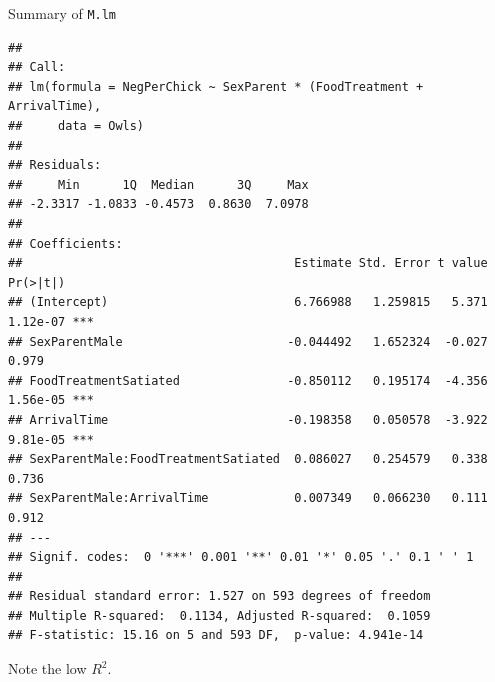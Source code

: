 \documentclass[
  ignorenonframetext,
]{beamer}
\begin{document}
\begin{frame}[fragile]{Summary of \texttt{M.lm}}
\protect\hypertarget{summary-of-m.lm}{}
\tiny

\begin{verbatim}
## 
## Call:
## lm(formula = NegPerChick ~ SexParent * (FoodTreatment + ArrivalTime), 
##     data = Owls)
## 
## Residuals:
##     Min      1Q  Median      3Q     Max 
## -2.3317 -1.0833 -0.4573  0.8630  7.0978 
## 
## Coefficients:
##                                      Estimate Std. Error t value Pr(>|t|)    
## (Intercept)                          6.766988   1.259815   5.371 1.12e-07 ***
## SexParentMale                       -0.044492   1.652324  -0.027    0.979    
## FoodTreatmentSatiated               -0.850112   0.195174  -4.356 1.56e-05 ***
## ArrivalTime                         -0.198358   0.050578  -3.922 9.81e-05 ***
## SexParentMale:FoodTreatmentSatiated  0.086027   0.254579   0.338    0.736    
## SexParentMale:ArrivalTime            0.007349   0.066230   0.111    0.912    
## ---
## Signif. codes:  0 '***' 0.001 '**' 0.01 '*' 0.05 '.' 0.1 ' ' 1
## 
## Residual standard error: 1.527 on 593 degrees of freedom
## Multiple R-squared:  0.1134, Adjusted R-squared:  0.1059 
## F-statistic: 15.16 on 5 and 593 DF,  p-value: 4.941e-14
\end{verbatim}

\normalsize

Note the low \(R^2\).
\end{frame}
\end{document}
